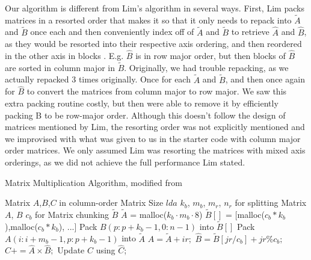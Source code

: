 \documentclass{article}
\begin{document}
Our algorithm is different from Lim's algorithm in several ways. First, Lim packs matrices in a resorted order that makes it so that it only needs to repack into $\tilde{A}$ and $\tilde{B}$ once each and then conveniently index off of $\tilde{A}$ and $\tilde{B}$ to retrieve $\hat{A}$ and $\hat{B}$, as they would be resorted into their respective axis ordering, and then reordered in the other axis in blocks \cite{10.1007/s10586-018-2810-y}. E.g. $\hat{B}$ is in row major order, but then blocks of $\hat{B}$ are sorted in column major in $\tilde{B}$. Originally, we had trouble repacking, as we actually repacked 3 times originally. Once for each $\tilde{A}$ and $\tilde{B}$, and then once again for $\hat{B}$ to convert the matrices from column major to row major. We saw this extra packing routine costly, but then were able to remove it by efficiently packing B to be row-major order. Although this doesn't follow the design of matrices mentioned by Lim, the resorting order was not explicitly mentioned and we improvised with what was given to us in the starter code with column major order matrices. We only assumed Lim was resorting the matrices with mixed axis orderings, as we did not achieve the full performance Lim stated.

\begin{algorithm}[H]
	\caption{Matrix Multiplication Algorithm, modified from \cite{10.1007/s10586-018-2810-y}}
	\begin{algorithmic}
		\Require Matrix $A$,$B$,$C$ in  column-order
		\Require Matrix Size $lda$
		\Require $k_b$, $m_b$, $m_r$, $n_r$ for splitting Matrix $A$, $B$
		\Require $c_b$ for Matrix chunking $\tilde{B}$
		\State $\tilde{A}$ = malloc($k_b \cdot m_b \cdot 8$)
		\State $\tilde{B}[]$ = [malloc($c_b * k_b$),malloc($c_b * k_b$), ...] 
		\State Pack $B(p : p + k_b - 1, 0: n - 1)$ into $\tilde{B}[]$ 
		\State Pack $A(i : i + m_b - 1, p: p + k_b - 1)$ into $\tilde{A}$ 
		\State $\hat{A} = \tilde{A} + ir;$
		\State $\hat{B} = \tilde{B}[jr/c_b] + jr\%c_b;$
		\State $\hat{C} += \hat{A}\times\hat{B};$ 
		\State Update $C$ using $\hat{C}$;
		\EndFor
		\EndFor
		\EndFor
		\EndFor
	\end{algorithmic}
	\label{alg:algorithm1}
\end{algorithm}
\end{document}
